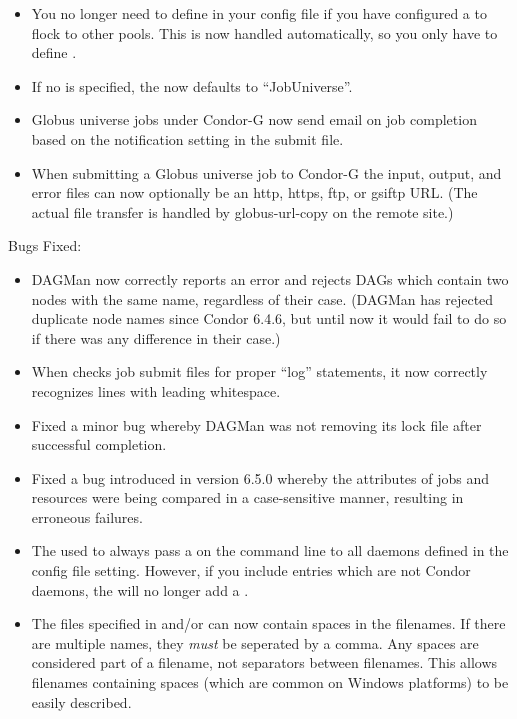 \begin{itemize}
\item You no longer need to define  in
  your config file if you have configured a  to flock
  to other pools.
  This is now handled automatically, so you only have to define
  .

\item If no  is specified, the 
  now defaults to ``JobUniverse''.

\item Globus universe jobs under Condor-G now send email on job
completion based on the notification setting in the submit file.

\item When submitting a Globus universe job to Condor-G the
input, output, and error files can now optionally be an http,
https, ftp, or gsiftp URL.  (The actual file transfer is handled
by globus-url-copy on the remote site.)

\end{itemize}

\noindent Bugs Fixed:
\begin{itemize}

\item DAGMan now correctly reports an error and rejects DAGs which
      contain two nodes with the same name, regardless of their case.
      (DAGMan has rejected duplicate node names since Condor 6.4.6,
      but until now it would fail to do so if there was any difference
      in their case.)

\item When  checks job submit files for proper
      ``log'' statements, it now correctly recognizes lines with
      leading whitespace.

\item Fixed a minor bug whereby DAGMan was not removing its lock file
      after successful completion.

\item Fixed a bug introduced in version 6.5.0 whereby the
       attributes of jobs and resources were being
      compared in a case-sensitive manner, resulting in erroneous
      failures.

\item The  used to always pass a  on the
  command line to all daemons defined in the 
  config file setting.
  However, if you include entries which are not Condor daemons, the
   will no longer add a .

\item The files specified in  and/or 
   can now contain spaces in the
  filenames.
  If there are multiple names, they \emph{must} be seperated by a
  comma.
  Any spaces are considered part of a filename, not separators between
  filenames.
  This allows filenames containing spaces (which are common on Windows
  platforms) to be easily described.

\end{itemize}


